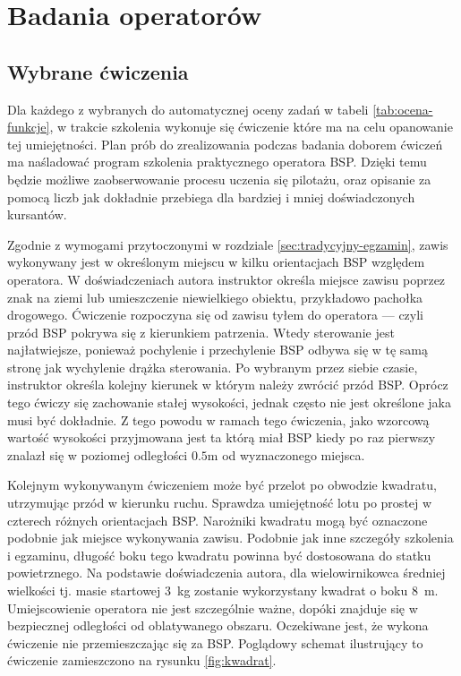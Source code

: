 \newpage
\section{Badania operatorów}

\subsection{Wybrane ćwiczenia}
\label{sec:wybrane-cwiczenia}
Dla każdego z wybranych do automatycznej oceny zadań w tabeli \ref{tab:ocena-funkcje}, w trakcie szkolenia wykonuje się ćwiczenie które ma na celu opanowanie tej umiejętności. Plan prób do zrealizowania podczas badania doborem ćwiczeń ma naśladować program szkolenia praktycznego operatora BSP. Dzięki temu będzie możliwe zaobserwowanie procesu uczenia się pilotażu, oraz opisanie za pomocą liczb jak dokładnie przebiega dla bardziej i mniej doświadczonych kursantów.

Zgodnie z wymogami przytoczonymi w rozdziale \ref{sec:tradycyjny-egzamin}, zawis wykonywany jest w określonym miejscu w kilku orientacjach BSP względem operatora. W doświadczeniach autora instruktor określa miejsce zawisu poprzez znak na ziemi lub umieszczenie niewielkiego obiektu, przykładowo pachołka drogowego. Ćwiczenie rozpoczyna się od zawisu tyłem do operatora --- czyli przód BSP pokrywa się z kierunkiem patrzenia. Wtedy sterowanie jest najłatwiejsze, ponieważ pochylenie i przechylenie BSP odbywa się w tę samą stronę jak wychylenie drążka sterowania. Po wybranym przez siebie czasie, instruktor określa kolejny kierunek w którym należy zwrócić przód BSP. Oprócz tego ćwiczy się zachowanie stałej wysokości, jednak często nie jest określone jaka musi być dokładnie. Z tego powodu w ramach tego ćwiczenia, jako wzorcową wartość wysokości przyjmowana jest ta którą miał BSP kiedy po raz pierwszy znalazł się w poziomej odległości $ 0.5 \text{m} $ od wyznaczonego miejsca.

Kolejnym wykonywanym ćwiczeniem może być przelot po obwodzie kwadratu, utrzymując przód w kierunku ruchu. Sprawdza umiejętność lotu po prostej w czterech różnych orientacjach BSP. Narożniki kwadratu mogą być oznaczone podobnie jak miejsce wykonywania zawisu. Podobnie jak inne szczegóły szkolenia i egzaminu, długość boku tego kwadratu powinna być dostosowana do statku powietrznego. Na podstawie doświadczenia autora, dla wielowirnikowca średniej wielkości tj. masie startowej 3~kg zostanie wykorzystany kwadrat o boku 8~m. Umiejscowienie operatora nie jest szczególnie ważne, dopóki znajduje się w bezpiecznej odległości od oblatywanego obszaru. Oczekiwane jest, że wykona ćwiczenie nie przemieszczając się za BSP. Poglądowy schemat ilustrujący to ćwiczenie zamieszczono na rysunku \ref{fig:kwadrat}.

